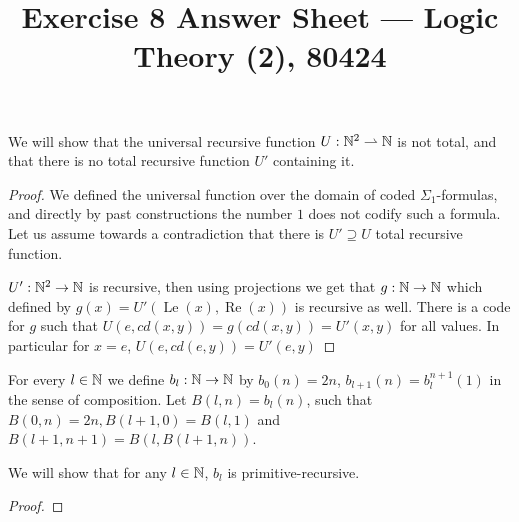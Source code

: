 
\title{Exercise 8 Answer Sheet --- Logic Theory (2), 80424}

\DeclareMathOperator{\PA}{PA}
\DeclareMathOperator{\Coll}{Coll}
\DeclareMathOperator{\Ind}{Ind}
\DeclareMathOperator{\Sat}{Sat}


\maketitle
\maketitleprint[yellow]

\question[2]
We will show that the universal recursive function $U : \mathbb{N}^2 \rightharpoonup \mathbb{N}$ is not total,
and that there is no total recursive function $U'$ containing it.
\begin{proof}
	We defined the universal function over the domain of coded $\Sigma_1$-formulas, and directly by past constructions the number $1$ does not codify such a formula.
	Let us assume towards a contradiction that there is $U' \supseteq U$ total recursive function.

	$U' : \mathbb{N}^2 \to \mathbb{N}$ is recursive, then using projections we get that $g : \mathbb{N} \to \mathbb{N}$ which defined by $g(x) = U'(\operatorname{Le}(x), \operatorname{Re}(x))$ is recursive as well.
	There is a code for $g$ such that $U(e, cd(x, y)) = g(cd(x, y)) = U'(x, y)$ for all values.
	In particular for $x = e$, $U(e, cd(e, y)) = U'(e, y)$


\end{proof}

\question{}
For every $l \in \mathbb{N}$ we define $b_l : \mathbb{N} \to \mathbb{N}$ by $b_0(n) = 2n$, $b_{l + 1}(n) = b_l^{n + 1}(1)$ in the sense of composition.
Let $B(l, n) = b_l(n)$, such that $B(0, n) = 2n, B(l + 1, 0) = B(l, 1)$ and $B(l + 1, n + 1) = B(l, B(l + 1, n))$.

\subquestion{}
We will show that for any $l \in \mathbb{N}$, $b_l$ is primitive-recursive.
\begin{proof}
	
\end{proof}


